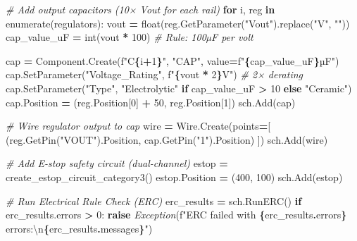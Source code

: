 \documentclass[
]{article}
\newenvironment{Shaded}{\begin{snugshade}}{\end{snugshade}}
\newcommand{\BuiltInTok}[1]{#1}
\newcommand{\CharTok}[1]{\textcolor[rgb]{0.31,0.60,0.02}{#1}}
\newcommand{\CommentTok}[1]{\textcolor[rgb]{0.56,0.35,0.01}{\textit{#1}}}
\newcommand{\ControlFlowTok}[1]{\textcolor[rgb]{0.13,0.29,0.53}{\textbf{#1}}}
\newcommand{\DecValTok}[1]{\textcolor[rgb]{0.00,0.00,0.81}{#1}}
\newcommand{\KeywordTok}[1]{\textcolor[rgb]{0.13,0.29,0.53}{\textbf{#1}}}
\newcommand{\NormalTok}[1]{#1}
\newcommand{\OperatorTok}[1]{\textcolor[rgb]{0.81,0.36,0.00}{\textbf{#1}}}
\newcommand{\PreprocessorTok}[1]{\textcolor[rgb]{0.56,0.35,0.01}{\textit{#1}}}
\newcommand{\SpecialCharTok}[1]{\textcolor[rgb]{0.81,0.36,0.00}{\textbf{#1}}}
\newcommand{\SpecialStringTok}[1]{\textcolor[rgb]{0.31,0.60,0.02}{#1}}
\newcommand{\StringTok}[1]{\textcolor[rgb]{0.31,0.60,0.02}{#1}}
\begin{document}
\begin{Shaded}
\begin{Highlighting}[]
    \CommentTok{\# Add output capacitors (10× Vout for each rail)}
    \ControlFlowTok{for}\NormalTok{ i, reg }\KeywordTok{in} \BuiltInTok{enumerate}\NormalTok{(regulators):}
\NormalTok{        vout }\OperatorTok{=} \BuiltInTok{float}\NormalTok{(reg.GetParameter(}\StringTok{"Vout"}\NormalTok{).replace(}\StringTok{"V"}\NormalTok{, }\StringTok{""}\NormalTok{))}
\NormalTok{        cap\_value\_uF }\OperatorTok{=} \BuiltInTok{int}\NormalTok{(vout }\OperatorTok{*} \DecValTok{100}\NormalTok{)  }\CommentTok{\# Rule: 100µF per volt}

\NormalTok{        cap }\OperatorTok{=}\NormalTok{ Component.Create(}\SpecialStringTok{f"C}\SpecialCharTok{\{}\NormalTok{i}\OperatorTok{+}\DecValTok{1}\SpecialCharTok{\}}\SpecialStringTok{"}\NormalTok{, }\StringTok{"CAP"}\NormalTok{, value}\OperatorTok{=}\SpecialStringTok{f"}\SpecialCharTok{\{}\NormalTok{cap\_value\_uF}\SpecialCharTok{\}}\SpecialStringTok{µF"}\NormalTok{)}
\NormalTok{        cap.SetParameter(}\StringTok{"Voltage\_Rating"}\NormalTok{, }\SpecialStringTok{f"}\SpecialCharTok{\{}\NormalTok{vout }\OperatorTok{*} \DecValTok{2}\SpecialCharTok{\}}\SpecialStringTok{V"}\NormalTok{)  }\CommentTok{\# 2× derating}
\NormalTok{        cap.SetParameter(}\StringTok{"Type"}\NormalTok{, }\StringTok{"Electrolytic"} \ControlFlowTok{if}\NormalTok{ cap\_value\_uF }\OperatorTok{\textgreater{}} \DecValTok{10} \ControlFlowTok{else} \StringTok{"Ceramic"}\NormalTok{)}
\NormalTok{        cap.Position }\OperatorTok{=}\NormalTok{ (reg.Position[}\DecValTok{0}\NormalTok{] }\OperatorTok{+} \DecValTok{50}\NormalTok{, reg.Position[}\DecValTok{1}\NormalTok{])}
\NormalTok{        sch.Add(cap)}

        \CommentTok{\# Wire regulator output to cap}
\NormalTok{        wire }\OperatorTok{=}\NormalTok{ Wire.Create(points}\OperatorTok{=}\NormalTok{[}
\NormalTok{            (reg.GetPin(}\StringTok{"VOUT"}\NormalTok{).Position, cap.GetPin(}\StringTok{"1"}\NormalTok{).Position)}
\NormalTok{        ])}
\NormalTok{        sch.Add(wire)}

    \CommentTok{\# Add E{-}stop safety circuit (dual{-}channel)}
\NormalTok{    estop }\OperatorTok{=}\NormalTok{ create\_estop\_circuit\_category3()}
\NormalTok{    estop.Position }\OperatorTok{=}\NormalTok{ (}\DecValTok{400}\NormalTok{, }\DecValTok{100}\NormalTok{)}
\NormalTok{    sch.Add(estop)}

    \CommentTok{\# Run Electrical Rule Check (ERC)}
\NormalTok{    erc\_results }\OperatorTok{=}\NormalTok{ sch.RunERC()}
    \ControlFlowTok{if}\NormalTok{ erc\_results.errors }\OperatorTok{\textgreater{}} \DecValTok{0}\NormalTok{:}
        \ControlFlowTok{raise} \PreprocessorTok{Exception}\NormalTok{(}\SpecialStringTok{f"ERC failed with }\SpecialCharTok{\{}\NormalTok{erc\_results}\SpecialCharTok{.}\NormalTok{errors}\SpecialCharTok{\}}\SpecialStringTok{ errors:}\CharTok{\textbackslash{}n}\SpecialCharTok{\{}\NormalTok{erc\_results}\SpecialCharTok{.}\NormalTok{messages}\SpecialCharTok{\}}\SpecialStringTok{"}\NormalTok{)}


\end{Highlighting}
\end{Shaded}
\end{document}
